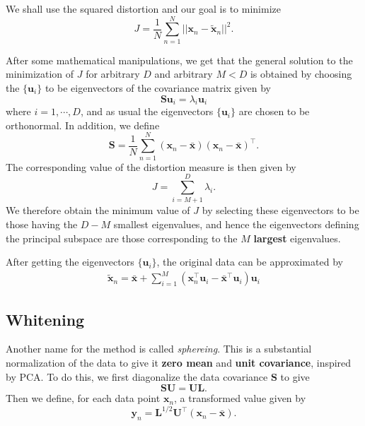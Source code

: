 \documentclass[a4paper]{report}
\renewcommand{\bf}{\mathbf}
\newcommand{\imp}[1]{{\color{blue}\textit{#1}}}
\begin{document}
We shall use the squared distortion and our goal is to minimize
\begin{equation}
	J = \frac{1}{N} \sum_{n=1}^N ||\bf{x}_n-\tilde{\bf{x}}_n||^2.
\end{equation}

After some mathematical manipulations, we get that the general solution to the minimization of $J$ for arbitrary $D$ and arbitrary $M < D$ is obtained by choosing the $\{ \bf{u}_i \}$ to be eigenvectors of the covariance matrix given by
\begin{equation}
	\bf{S} \bf{u}_i = \lambda_i \bf{u}_i
\end{equation}
where $i=1,\cdots,D$, and as usual the eigenvectors $\{ \bf{u}_i \}$ are chosen to be orthonormal. In addition, we define
\begin{equation}
	 \bf{S} = \frac{1}{N} \sum_{n=1}^N (\bf{x}_n-\bar{\bf{x}})(\bf{x}_n-\bar{\bf{x}})^{\intercal}.
\end{equation}
The corresponding value of the distortion measure is then given by
\begin{equation}
	J = \sum_{i=M+1}^D \lambda_i.
\end{equation}
We therefore obtain the minimum value of $J$ by selecting these eigenvectors to be those having the $D-M$ smallest eigenvalues, and hence the eigenvectors defining the principal subspace are those corresponding to the $M$ \textbf{largest} eigenvalues.

After getting the eigenvectors $\{ \bf{u}_i \}$, the original data can be approximated by
\begin{align}
	\tilde{\bf{x}}_n = \bar{\bf{x}} + \sum_{i=1}^M (\bf{x}_n^{\intercal} \bf{u}_i - \bar{\bf{x}}^{\intercal} \bf{u}_i)\bf{u}_i
\end{align}

\subsection{Whitening}
Another name for the method is called \imp{sphereing}. This is a substantial normalization of the data to give it \textbf{zero mean} and \textbf{unit covariance}, inspired by PCA. To do this, we first diagonalize the data covariance $\bf{S}$ to give
\begin{equation}
	\bf{SU} = \bf{UL}.
\end{equation}
Then we define, for each data point $\bf{x}_n$, a transformed value given by
\begin{equation}
	\bf{y}_n = \bf{L}^{1/2}\bf{U}^{\intercal} (\bf{x}_n - \bar{\bf{x}}).
\end{equation}
\end{document}

